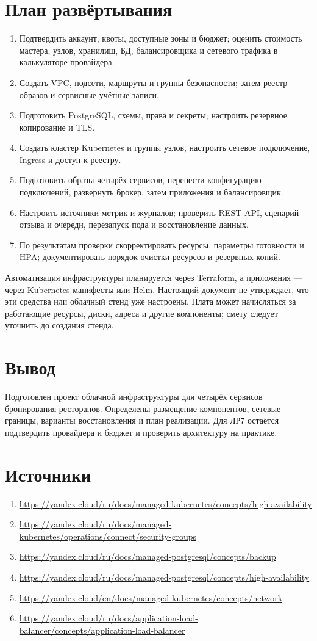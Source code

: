 \documentclass[14pt,a4paper]{extarticle}
\begin{document}
\section{План развёртывания}
\begin{enumerate}
\item Подтвердить аккаунт, квоты, доступные зоны и бюджет; оценить стоимость мастера, узлов, хранилищ, БД, балансировщика и сетевого трафика в калькуляторе провайдера.
\item Создать VPC, подсети, маршруты и группы безопасности; затем реестр образов и сервисные учётные записи.
\item Подготовить PostgreSQL, схемы, права и секреты; настроить резервное копирование и TLS.
\item Создать кластер Kubernetes и группы узлов, настроить сетевое подключение, Ingress и доступ к реестру.
\item Подготовить образы четырёх сервисов, перенести конфигурацию подключений, развернуть брокер, затем приложения и балансировщик.
\item Настроить источники метрик и журналов; проверить REST API, сценарий отзыва и очереди, перезапуск пода и восстановление данных.
\item По результатам проверки скорректировать ресурсы, параметры готовности и HPA; документировать порядок очистки ресурсов и резервных копий.
\end{enumerate}
Автоматизация инфраструктуры планируется через Terraform, а приложения --- через Kubernetes-манифесты или Helm. Настоящий документ не утверждает, что эти средства или облачный стенд уже настроены. Плата может начисляться за работающие ресурсы, диски, адреса и другие компоненты; смету следует уточнить до создания стенда.
\section{Вывод}
Подготовлен проект облачной инфраструктуры для четырёх сервисов бронирования ресторанов. Определены размещение компонентов, сетевые границы, варианты восстановления и план реализации. Для ЛР7 остаётся подтвердить провайдера и бюджет и проверить архитектуру на практике.
\section{Источники}
\begin{enumerate}
\item \url{https://yandex.cloud/ru/docs/managed-kubernetes/concepts/high-availability}
\item \url{https://yandex.cloud/ru/docs/managed-kubernetes/operations/connect/security-groups}
\item \url{https://yandex.cloud/ru/docs/managed-postgresql/concepts/backup}
\item \url{https://yandex.cloud/ru/docs/managed-postgresql/concepts/high-availability}
\item \url{https://yandex.cloud/en/docs/managed-kubernetes/concepts/network}
\item \url{https://yandex.cloud/ru/docs/application-load-balancer/concepts/application-load-balancer}
\end{enumerate}
\end{document}
